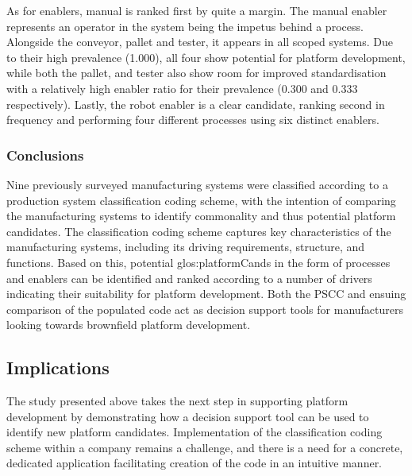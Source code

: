 As for enablers, manual is ranked first by quite a margin.
The manual enabler represents an operator in the system being the impetus behind a process.
Alongside the conveyor, pallet and tester, it appears in all scoped systems.
Due to their high prevalence (1.000), all four show potential for platform development, while both the pallet, and tester also show room for improved standardisation with a relatively high enabler ratio for their prevalence (0.300 and 0.333 respectively).
Lastly, the robot enabler is a clear candidate, ranking second in frequency and performing four different processes using six distinct enablers.

\subsubsection*{Conclusions}
Nine previously surveyed manufacturing systems were classified according to a production system classification coding scheme, with the intention of comparing the manufacturing systems to identify commonality and thus potential platform candidates.
The classification coding scheme captures key characteristics of the manufacturing systems, including its driving requirements, structure, and functions.
Based on this, potential \gls{glos:platformCand}s in the form of processes and enablers can be identified and ranked according to a number of drivers indicating their suitability for platform development.
Both the PSCC and ensuing comparison of the populated code act as decision support tools for manufacturers looking towards brownfield platform development.

\subsection{Implications}
The study presented above takes the next step in supporting platform development by demonstrating how a decision support tool can be used to identify new platform candidates.
Implementation of the classification coding scheme within a company remains a challenge, and there is a need for a concrete, dedicated application facilitating creation of the code in an intuitive manner.

